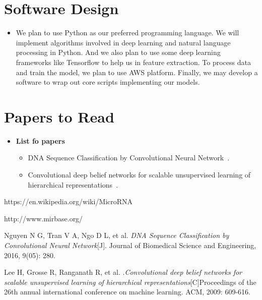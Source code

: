 \documentclass[letterpaper, 11pt]{article}
\begin{document}
\section{Software Design}
\begin{itemize}
\item
We plan to use Python as our preferred programming language. We will implement algorithms involved in deep learning and natural language processing in Python. And we also plan to use some deep learning frameworks like Tensorflow to help us in feature extraction. To process data and train the model, we plan to use AWS platform. Finally, we may develop a software to wrap out core scripts implementing our models.
\end{itemize}


\section{Papers to Read}
\begin{itemize}
\item
	\textbf{List fo papers}
	
	\begin{itemize}
	\item
		DNA Sequence Classification by Convolutional Neural Network~\cite{NLP}.
		
	\item
		Convolutional deep belief networks for scalable unsupervised learning of hierarchical representations~\cite{CNN}.
	\end{itemize}
\end{itemize}


\begin{thebibliography}{1}
\textit{}https://en.wikipedia.org/wiki/MicroRNA

\textit{}http://www.mirbase.org/

Nguyen N G, Tran V A, Ngo D L, et al. \textit{DNA Sequence Classification by Convolutional Neural Network}[J]. Journal of Biomedical Science and Engineering, 2016, 9(05): 280.

Lee H, Grosse R, Ranganath R, et al. .\textit{Convolutional deep belief networks for scalable unsupervised learning of hierarchical representations}[C]Proceedings of the 26th annual international conference on machine learning. ACM, 2009: 609-616.
\end{thebibliography}
\end{document}
